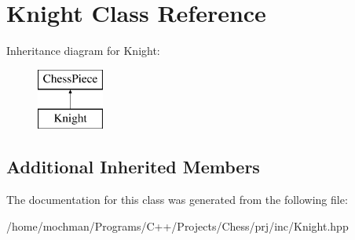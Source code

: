 \hypertarget{class_knight}{\section{Knight Class Reference}
\label{class_knight}
}
Inheritance diagram for Knight\-:\begin{figure}[H]
\begin{center}
\leavevmode
\includegraphics[height=2.000000cm]{class_knight}
\end{center}
\end{figure}
\subsection*{Additional Inherited Members}


The documentation for this class was generated from the following file\-:\begin{DoxyCompactItemize}
\item 
/home/mochman/\-Programs/\-C++/\-Projects/\-Chess/prj/inc/Knight.\-hpp\end{DoxyCompactItemize}
